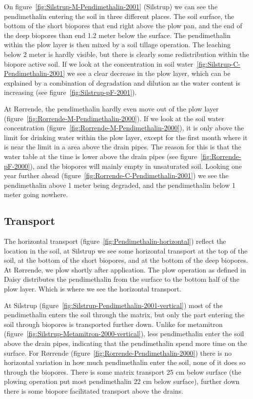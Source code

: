 On figure~\ref{fig:Silstrup-M-Pendimethalin-2001} (Silstrup) we can see
the pendimethalin entering the soil in three different places.  The soil
surface, the bottom of the short biopores that end right above the
plow pan, and the end of the deep biopores than end 1.2 meter below
the surface.  The pendimethalin within the plow layer is then mixed by a
soil tillage operation.  The leaching below 2 meter is hardly visible,
but there is clearly some redistribution within the biopore active
soil.  If we look at the concentration in soil
water~\ref{fig:Silstrup-C-Pendimethalin-2001} we see a clear decrease in
the plow layer, which can be explained by a combination of degradation
and dilution as the water content is increasing (see
figure~\ref{fig:Silstrup-pF-2001}).

At R{\o}rrende, the pendimethalin hardly even move out of the plow layer
(figure~\ref{fig:Rorrende-M-Pendimethalin-2000}).  If we look at the soil
water concentration (figure~\ref{fig:Rorrende-M-Pendimethalin-2000}), it is
only above the limit for drinking water within the plow layer, except
for the first month where it is near the limit in a area above the
drain pipes.  The reason for this is that the water table at the time
is lower above the drain pipes (see figure~\ref{fig:Rorrende-pF-2000}),
and the biopores will mainly empty in unsaturated soil.  Looking one
year further ahead (figure~\ref{fig:Rorrende-C-Pendimethalin-2001}) we see
the pendimethalin above 1 meter being degraded, and the pendimethalin below
1 meter going nowhere.

\subsection{Transport}

The horizontal transport (figure~\ref{fig:Pendimethalin-horizontal}) reflect
the location in the soil, at Silstrup we see some horizontal transport at
the top of the soil, at the bottom of the short biopores, and at the
bottom of the deep biopores.  At R{\o}rrende, we plow shortly after
application.  The plow operation as defined in Daisy distributes the
pendimethalin from the surface to the bottom half of the plow layer.
Which is where we see the horizontal transport.

At Silstrup (figure~\ref{fig:Silstrup-Pendimethalin-2001-vertical}) most
of the pendimethalin enters the soil through the matrix, but only the
part entering the soil through biopores is transported further down.
Unlike for metamitron
(figure~\ref{fig:Silstrup-Metamitron-2000-vertical}), less pendimethalin
enter the soil above the drain pipes, indicating that the pendimethalin
spend more time on the surface.  For R{\o}rrende
(figure~\ref{fig:Rorrende-Pendimethalin-2000}) there is no horizontal
variation in how much pendimethalin enter the soil, none of it does so
through the biopores.  There is some matrix transport 25 cm below surface
(the plowing operation put most pendimethalin 22 cm below surface),
further down there is some biopore facilitated transport above the
drains.

